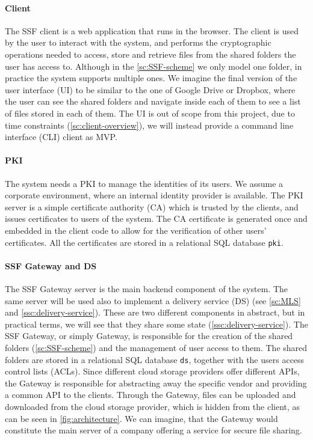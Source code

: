 \paragraph{Client} The SSF client is a web application that
runs in the browser. The client is used by the user to interact with the system, and performs the cryptographic
operations needed to access, store and retrieve files 
from the shared folders the user has access to.
Although in the \cref{sc:SSF-scheme} we only model one folder,
in practice the system supports multiple ones.
We imagine the final version of the user interface (UI) to
be similar to the one of Google Drive or Dropbox, where
the user can see the shared folders and navigate inside each
of them to see a list of files stored in each of them.
The UI is out of scope from this project, due to
time constraints (\cref{sc:client-overview}), we will
instead provide a command line interface (CLI) client
as MVP.

\paragraph{PKI} The system needs a PKI to manage the identities
of its users. We assume a corporate environment, where
an internal identity provider is available. The PKI server
is a simple certificate authority (CA) which is trusted
by the clients, and issues certificates to users of the system.
The CA certificate is generated once and embedded in the client
code to allow for the verification of other users' certificates.
All the certificates are stored in a relational SQL database \texttt{pki}.

\paragraph{SSF Gateway and DS}
The SSF Gateway server is the main backend component of the system.
The same server will be used also to implement a delivery service (DS) (see \cref{sc:MLS} and \cref{ssc:delivery-service}).
These are two different components in abstract, but in practical terms, 
we will see that they share some state (\cref{ssc:delivery-service}).
The SSF Gateway, or simply Gateway, is responsible for the
creation of the shared folders (\cref{sc:SSF-scheme}) and the management of user access
to them. The shared folders are stored in a relational SQL
database \texttt{ds}, together with the users access control lists (ACLs).
Since different cloud storage providers offer different APIs,
the Gateway is responsible for abstracting away the specific
vendor and providing a common API to the clients.
Through the Gateway, files can be uploaded and downloaded 
from the cloud storage provider, which is hidden from the client,
as can be seen in \cref{fig:architecture}.
We can imagine, that the Gateway would constitute the main
server of a company offering a service for secure file sharing.

